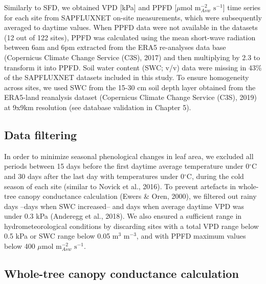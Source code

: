\documentclass[11pt,twoside]{reedthesis}
\begin{document}
Similarly to SFD, we obtained VPD {[}kPa{]} and PPFD {[}\(\mu\)mol
\(\text{m}^{-2}_{Asw}\) \(\text{s}^{-1}\){]} time series for each site
from SAPFLUXNET on-site measurements, which were subsequently averaged
to daytime values. When PPFD data were not available in the datasets (12
out of 122 sites), PPFD was calculated using the mean short-wave
radiation between 6am and 6pm extracted from the ERA5 re-analyses data
base (Copernicus Climate Change Service (C3S), 2017) and then
multiplying by 2.3 to transform it into PPFD. Soil water content (SWC;
v/v) data were missing in 43\% of the SAPFLUXNET datasets included in
this study. To ensure homogeneity across sites, we used SWC from the
15-30 cm soil depth layer obtained from the ERA5-land reanalysis dataset
(Copernicus Climate Change Service (C3S), 2019) at 9x9km resolution (see
database validation in Chapter 5).\par

\subsection{Data filtering}\label{data-filtering}

In order to minimize seasonal phenological changes in leaf area, we
excluded all periods between 15 days before the first daytime average
temperature under 0\(^{\circ}\)C and 30 days after the last day with
temperatures under 0\(^{\circ}\)C, during the cold season of each site
(similar to Novick et al., 2016). To prevent artefacts in whole-tree
canopy conductance calculation (Ewers \& Oren, 2000), we filtered out
rainy days --days when SWC increased-- and days when average daytime VPD
was under 0.3 kPa (Anderegg et al., 2018). We also ensured a sufficient
range in hydrometeorological conditions by discarding sites with a total
VPD range below 0.5 kPa or SWC range below 0.05 \(\text{m}^{3}\)
\(\text{m}^{-3}\), and with PPFD maximum values below 400 \(\mu\)mol
\(\text{m}^{-2}_{Asw}\) \(\text{s}^{-1}\).\par

\subsection{Whole-tree canopy conductance
calculation}\label{whole-tree-canopy-conductance-calculation}
\end{document}
